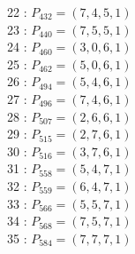 \documentclass{article}
\begin{document}
{\begin{multicols}{2}
22 : $P_{432}=( 7, 4, 5, 1 )$\\
23 : $P_{440}=( 7, 5, 5, 1 )$\\
24 : $P_{460}=( 3, 0, 6, 1 )$\\
25 : $P_{462}=( 5, 0, 6, 1 )$\\
26 : $P_{494}=( 5, 4, 6, 1 )$\\
27 : $P_{496}=( 7, 4, 6, 1 )$\\
28 : $P_{507}=( 2, 6, 6, 1 )$\\
29 : $P_{515}=( 2, 7, 6, 1 )$\\
30 : $P_{516}=( 3, 7, 6, 1 )$\\
31 : $P_{558}=( 5, 4, 7, 1 )$\\
32 : $P_{559}=( 6, 4, 7, 1 )$\\
33 : $P_{566}=( 5, 5, 7, 1 )$\\
34 : $P_{568}=( 7, 5, 7, 1 )$\\
35 : $P_{584}=( 7, 7, 7, 1 )$\\
\end{multicols}
}
\end{document}
